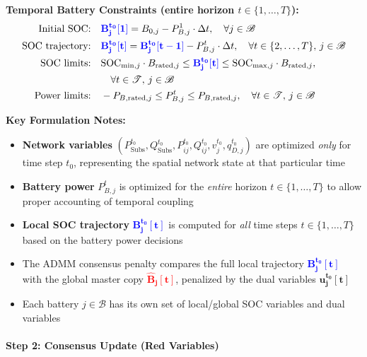 \textbf{Temporal Battery Constraints (entire horizon $t \in \{1, \ldots, T\}$):}
\begin{align}
\text{Initial SOC:} \quad & \textcolor{blue}{\mathbf{B_j^{t_0}[1]}} = B_{0,j} - P_{B,j}^1 \cdot \Delta t, \quad \forall j \in \mathcal{B} \\
\text{SOC trajectory:} \quad & \textcolor{blue}{\mathbf{B_j^{t_0}[t]}} = \textcolor{blue}{\mathbf{B_j^{t_0}[t-1]}} - P_{B,j}^t \cdot \Delta t, \quad \forall t \in \{2, \ldots, T\}, \, j \in \mathcal{B} \\
\text{SOC limits:} \quad & \text{SOC}_{\min,j} \cdot B_{\text{rated},j} \leq \textcolor{blue}{\mathbf{B_j^{t_0}[t]}} \leq \text{SOC}_{\max,j} \cdot B_{\text{rated},j}, \notag \\
& \quad \forall t \in \mathcal{T}, \, j \in \mathcal{B} \\
\text{Power limits:} \quad & -P_{B,\text{rated},j} \leq P_{B,j}^t \leq P_{B,\text{rated},j}, \quad \forall t \in \mathcal{T}, \, j \in \mathcal{B}
\end{align}

\textbf{Key Formulation Notes:}
\begin{itemize}
    \item \textbf{Network variables} $(P_{\text{Subs}}^{t_0}, Q_{\text{Subs}}^{t_0}, P_{ij}^{t_0}, Q_{ij}^{t_0}, v_j^{t_0}, q_{D,j}^{t_0})$ are optimized \textit{only} for time step $t_0$, representing the spatial network state at that particular time
    \item \textbf{Battery power} $P_{B,j}^t$ is optimized for the \textit{entire} horizon $t \in \{1, \ldots, T\}$ to allow proper accounting of temporal coupling
    \item \textbf{Local SOC trajectory} \textcolor{blue}{$\mathbf{B_j^{t_0}[t]}$} is computed for \textit{all} time steps $t \in \{1, \ldots, T\}$ based on the battery power decisions
    \item The ADMM consensus penalty compares the full local trajectory \textcolor{blue}{$\mathbf{B_j^{t_0}[t]}$} with the global master copy \textcolor{red}{$\mathbf{\hat{B}_j[t]}$}, penalized by the dual variables \textcolor{green!60!black}{$\mathbf{u_j^{t_0}[t]}$}
    \item Each battery $j \in \mathcal{B}$ has its own set of local/global SOC variables and dual variables
\end{itemize}

\paragraph{Step 2: Consensus Update (Red Variables)}

